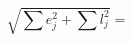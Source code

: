\documentclass{minimal}
\begin{document}
\begin{equation}
\sqrt{\sum e_j^2 + \sum l_j^2} =
\end{equation}
\end{document}
